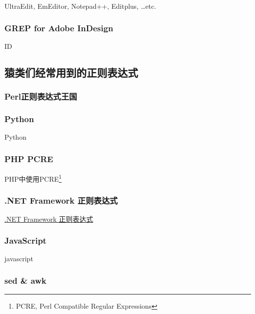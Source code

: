 \documentclass[12pt,a4paper,twoside]{ctexart}
\begin{document}
UltraEdit, EmEditor, Notepad++, Editplus, \ldots etc. \par

\subsubsection{GREP for Adobe InDesign}
\label{sec:indesign}

ID

\clearpage{}

\subsection{猿类们经常用到的正则表达式}
\label{sec:prog-regex}

\subsubsection{Perl正则表达式王国}
\label{sec:perl}

%

\subsubsection{Python}
\label{sec:python}

Python

\subsubsection{PHP PCRE}
\label{sec:php-pcre}

PHP中使用PCRE\footnote{PCRE, Perl Compatible Regular Expressions} \par

\subsubsection{.NET Framework 正则表达式}
\label{sec:dotnet-regex}

\href{https://msdn.microsoft.com/zh-cn/library/az24scfc.aspx}{.NET Framework 正则表达式}

\subsubsection{JavaScript}
\label{sec:javascript}

javascript

\subsubsection{sed \& awk}
\label{sec:sed-awk}
\end{document}
